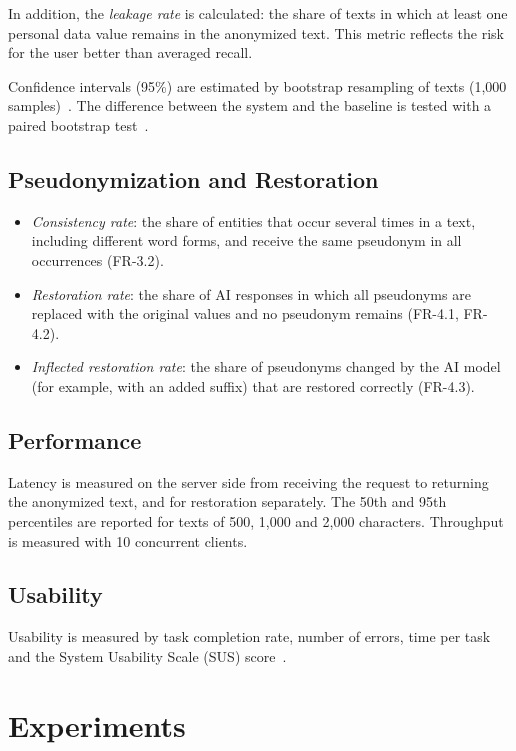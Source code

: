 \documentclass[12pt,a4paper]{article}
\begin{document}
In addition, the \emph{leakage rate} is calculated: the share of texts in which at least one personal data value remains in the anonymized text. This metric reflects the risk for the user better than averaged recall.

Confidence intervals (95\%) are estimated by bootstrap resampling of texts (1,000 samples)~\cite{efron}. The difference between the system and the baseline is tested with a paired bootstrap test~\cite{koehn}.

\subsection{Pseudonymization and Restoration}

\begin{itemize}
\item \emph{Consistency rate}: the share of entities that occur several times in a text, including different word forms, and receive the same pseudonym in all occurrences (FR-3.2).
\item \emph{Restoration rate}: the share of AI responses in which all pseudonyms are replaced with the original values and no pseudonym remains (FR-4.1, FR-4.2).
\item \emph{Inflected restoration rate}: the share of pseudonyms changed by the AI model (for example, with an added suffix) that are restored correctly (FR-4.3).
\end{itemize}

\subsection{Performance}

Latency is measured on the server side from receiving the request to returning the anonymized text, and for restoration separately. The 50th and 95th percentiles are reported for texts of 500, 1,000 and 2,000 characters. Throughput is measured with 10 concurrent clients.

\subsection{Usability}

Usability is measured by task completion rate, number of errors, time per task and the System Usability Scale (SUS) score~\cite{sus}.

\section{Experiments}
\end{document}
